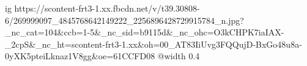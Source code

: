  
 
 
 
 

\ifcmt
  ig https://scontent-frt3-1.xx.fbcdn.net/v/t39.30808-6/269999097_4845768642149222_2256896428729915784_n.jpg?_nc_cat=104&ccb=1-5&_nc_sid=b9115d&_nc_ohc=O3kCHPK7iaIAX-_2cpS&_nc_ht=scontent-frt3-1.xx&oh=00_AT83IiUvg3FQQujD-BxGo48u8a-0yXK5pteiLknaz1V8gg&oe=61CCFD08
  @width 0.4
\fi
